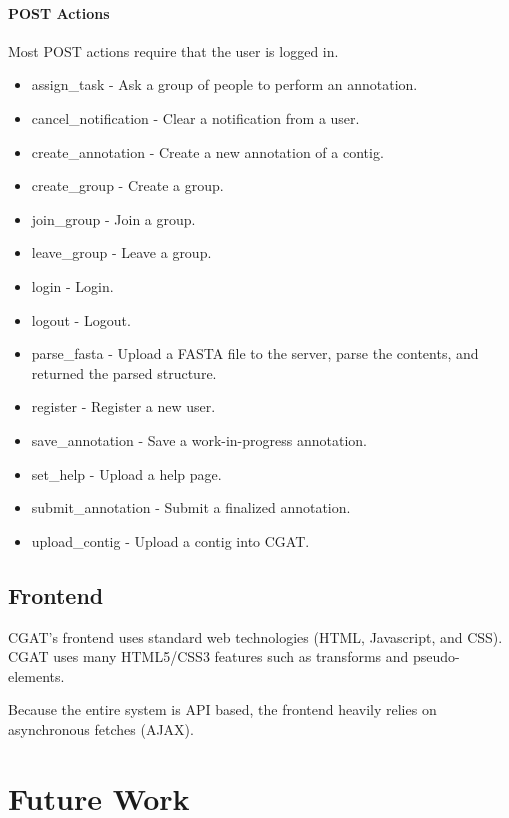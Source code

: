 \documentclass[10pt, conference, compsocconf]{IEEEtran}
\begin{document}
\paragraph{POST Actions}
Most POST actions require that the user is logged in.

\begin{itemize}
\item assign\_task - Ask a group of people to perform an annotation.
\item cancel\_notification - Clear a notification from a user.
\item create\_annotation - Create a new annotation of a contig.
\item create\_group - Create a group.
\item join\_group - Join a group.
\item leave\_group - Leave a group.
\item login - Login.
\item logout - Logout.
\item parse\_fasta - Upload a FASTA file to the server, parse the contents, and returned the parsed structure.
\item register - Register a new user.
\item save\_annotation - Save a work-in-progress annotation.
\item set\_help - Upload a help page.
\item submit\_annotation - Submit a finalized annotation.
\item upload\_contig - Upload a contig into CGAT.
\end{itemize}

\subsection{Frontend}
CGAT's frontend uses standard web technologies (HTML, Javascript, and CSS).
CGAT uses many HTML5/CSS3 features such as transforms and pseudo-elements.

Because the entire system is API based, the frontend heavily relies on asynchronous fetches (AJAX).

\section{Future Work}\label{sec:future}






\onecolumn
\appendices
\end{document}

